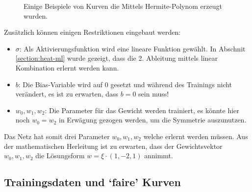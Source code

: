 \begin{figure}
	\centering
	
	\caption{Einige Beispiele von Kurven die Mittels Hermite-Polynom
	erzeugt wurden.
	\label{fig:mst_neuronalnetworkdemo} }
\end{figure}

Zusätzlich können einigen Restriktionen eingebaut werden:
\begin{itemize}
	\item {\boldmath$\sigma$}: Als Aktivierungsfunktion wird eine lineare Funktion gewählt. In Abschnit \ref{section:heat-ml} wurde gezeigt, dass die 2. Ableitung mittels linear Kombination erlernt werden kann.
	\item {\boldmath$b$}: Die Bias-Variable wird auf 0 gesetzt und während des Trainings nicht verändert, es ist zu erwarten, dass $b=0$ sein muss!
	\item {\boldmath$w_0,w_1,w_2$}: Die Parameter für das Gewicht werden trainiert, es könnte hier noch $w_0 = w_2$ in Erwägung gezogen werden, um die Symmetrie auszunutzen.
\end{itemize}
Das Netz hat somit drei Parameter $w_0, w_1, w_2$ welche erlernt werden müssen. Aus der mathematischen Herleitung ist zu erwarten, dass der Gewichtsvektor  $w_0, w_1, w_2$ die Lösungsform $w = \xi \cdot (1, -2, 1)$ annimmt.

\subsection{Trainingsdaten und `faire' Kurven}
